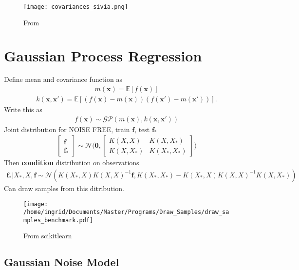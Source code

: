 \documentclass[twoside,english]{uiofysmaster}
\begin{document}
\begin{figure}
\centering
\texttt{[image: covariances\_sivia.png]}
\caption{From \cite{sivia2006data}}
\end{figure}


\section{Gaussian Process Regression}

Define mean and covariance function as
\begin{align}
m(\textbf{x}) = \mathbb{E}[f(\textbf{x})]
\end{align}
\begin{align}
k(\textbf{x}, \textbf{x}') = \mathbb{E} [(f(\textbf{x}) - m(\textbf{x}))(f(\textbf{x}') - m(\textbf{x}'))].
\end{align}
Write this as 
\begin{align}
f(\textbf{x}) \sim \mathcal{GP}(m(\textbf{x}), k(\textbf{x}, \textbf{x}'))
\end{align}
Joint distribution for NOISE FREE, train $\textbf{f}$, test $\textbf{f}_*$
\begin{align}
\begin{bmatrix}
\textbf{f}\\
\textbf{f}_*
\end{bmatrix}
\sim 
\mathcal{N} \Bigg(
\boldsymbol{0},
\begin{bmatrix}
K(X, X) & K(X, X_*)\\
K(X, X_*) & K(X_*, X_*)
\end{bmatrix}
 \Bigg)
\end{align}
Then \textbf{condition} distribution on observations
\begin{align}
\textbf{f}_* \big| X_*, X, \textbf{f} \sim \mathcal{N}(K(X_*, X)K(X, X)^{-1} \textbf{f}, K(X_*, X_*) - K(X_*, X)K(X, X)^{-1}K(X, X_*))
\end{align}
Can draw samples from this ditribution.

\begin{figure}
\centering
\texttt{[image: /home/ingrid/Documents/Master/Programs/Draw\_Samples/draw\_samples\_benchmark.pdf]}
\caption{From scikitlearn}
\end{figure}


\subsection{Gaussian Noise Model}
\end{document}
